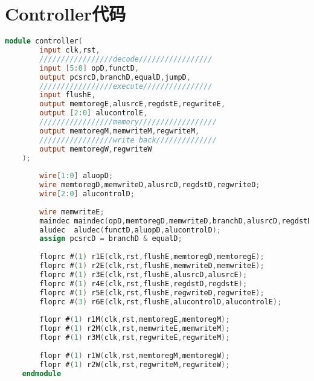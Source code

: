 \section{Controller代码}
\begin{lstlisting}[language=Verilog]
    module controller(
        input clk,rst,
        /////////////////decode/////////////////
        input [5:0] opD,functD,
        output pcsrcD,branchD,equalD,jumpD,
        /////////////////execute////////////////
        input flushE,
        output memtoregE,alusrcE,regdstE,regwriteE,	
        output [2:0] alucontrolE,
        /////////////////memory//////////////////
        output memtoregM,memwriteM,regwriteM,
        /////////////////write back//////////////
        output memtoregW,regwriteW
    );
    
        wire[1:0] aluopD;
        wire memtoregD,memwriteD,alusrcD,regdstD,regwriteD;
        wire[2:0] alucontrolD;
    
        wire memwriteE;
        maindec maindec(opD,memtoregD,memwriteD,branchD,alusrcD,regdstD,regwriteD,jumpD,aluopD);
        aludec  aludec(functD,aluopD,alucontrolD);
        assign pcsrcD = branchD & equalD;
        
        floprc #(1) r1E(clk,rst,flushE,memtoregD,memtoregE);
        floprc #(1) r2E(clk,rst,flushE,memwriteD,memwriteE);
        floprc #(1) r3E(clk,rst,flushE,alusrcD,alusrcE);
        floprc #(1) r4E(clk,rst,flushE,regdstD,regdstE);
        floprc #(1) r5E(clk,rst,flushE,regwriteD,regwriteE);
        floprc #(3) r6E(clk,rst,flushE,alucontrolD,alucontrolE);
        
        flopr #(1) r1M(clk,rst,memtoregE,memtoregM);
        flopr #(1) r2M(clk,rst,memwriteE,memwriteM);
        flopr #(1) r3M(clk,rst,regwriteE,regwriteM);
        
        flopr #(1) r1W(clk,rst,memtoregM,memtoregW);
        flopr #(1) r2W(clk,rst,regwriteM,regwriteW);
    endmodule
\end{lstlisting}
